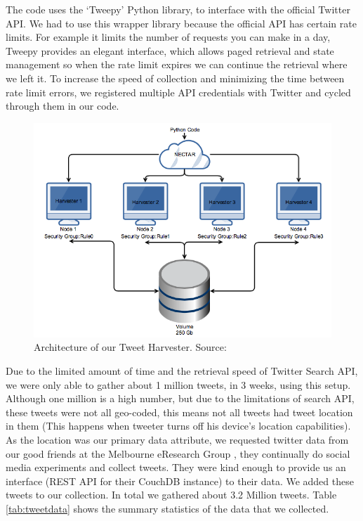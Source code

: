 \documentclass[12pt]{report}
\theoremstyle{named}
\begin{document}
The code uses the `Tweepy'\cite{Tweepy} Python library, to interface with the official Twitter API. We had to use this wrapper library because the official API has certain rate limits. For example it limits the number of requests you can make in a day, Tweepy provides an elegant interface, which allows paged retrieval and state management so when the rate limit expires we can continue the retrieval where we left it. To increase the speed of collection and minimizing the time between rate limit errors, we registered multiple API credentials with Twitter and cycled through them in our code.

\begin{figure}[ht]
\centering
        \includegraphics[width=120mm,scale=1]{Images/TweetHarvesting.png}
    \caption{Architecture of our Tweet Harvester. Source: \cite{clusterCloudReport}}
    \label{fig:tweetHarvester}
\end{figure}

Due to the limited amount of time and the retrieval speed of Twitter Search API, we were only able to gather about 1 million tweets, in 3 weeks, using this setup. Although one million is a high number, but due to the limitations of search API, these tweets were not all geo-coded, this means not all tweets had tweet location in them (This happens when tweeter turns off his device's location capabilities). As the location was our primary data attribute, we requested twitter data from our good friends at the Melbourne eResearch Group \cite{MelbEResrach}, they continually do social media experiments and collect tweets. They were kind enough to provide us an interface (REST API for their CouchDB instance) to their data. We added these tweets to our collection. In total we gathered about 3.2 Million tweets. Table \ref{tab:tweetdata} shows the summary statistics of the data that we collected.
\end{document}
